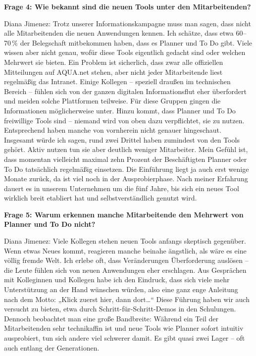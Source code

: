 \documentclass[
    12pt, 
    a4paper,
    ]{scrartcl} %
\begin{document}
\textbf{Frage 4: Wie bekannt sind die neuen Tools unter den Mitarbeitenden?}

Diana Jimenez: Trotz unserer Informationskampagne muss man sagen, dass nicht alle Mitarbeitenden die neuen Anwendungen kennen. Ich schätze, dass etwa 60–70\,\% der Belegschaft mitbekommen haben, dass es Planner und To Do gibt. Viele wissen aber nicht genau, wofür diese Tools eigentlich gedacht sind oder welchen Mehrwert sie bieten. Ein Problem ist sicherlich, dass zwar alle offiziellen Mitteilungen auf AQUA.net stehen, aber nicht jeder Mitarbeitende liest regelmäßig das Intranet. Einige Kollegen – speziell draußen im technischen Bereich – fühlen sich von der ganzen digitalen Informationsflut eher überfordert und meiden solche Plattformen teilweise. Für diese Gruppen gingen die Informationen möglicherweise unter. Hinzu kommt, dass Planner und To Do freiwillige Tools sind – niemand wird von oben dazu verpflichtet, sie zu nutzen. Entsprechend haben manche von vornherein nicht genauer hingeschaut. Insgesamt würde ich sagen, rund zwei Drittel haben zumindest von den Tools gehört. Aktiv nutzen tun sie aber deutlich weniger Mitarbeiter. Mein Gefühl ist, dass momentan vielleicht maximal zehn Prozent der Beschäftigten Planner oder To Do tatsächlich regelmäßig einsetzen. Die Einführung liegt ja auch erst wenige Monate zurück, da ist viel noch in der Ausprobierphase. Nach meiner Erfahrung dauert es in unserem Unternehmen um die fünf Jahre, bis sich ein neues Tool wirklich breit etabliert hat und selbstverständlich genutzt wird.

\textbf{Frage 5: Warum erkennen manche Mitarbeitende den Mehrwert von Planner und To Do nicht?}

Diana Jimenez: Viele Kollegen stehen neuen Tools anfangs skeptisch gegenüber. Wenn etwas Neues kommt, reagieren manche beinahe ängstlich, als wäre es eine völlig fremde Welt. Ich erlebe oft, dass Veränderungen Überforderung auslösen – die Leute fühlen sich von neuen Anwendungen eher erschlagen. Aus Gesprächen mit Kolleginnen und Kollegen habe ich den Eindruck, dass sich viele mehr Unterstützung an der Hand wünschen würden, also eine ganz enge Anleitung nach dem Motto: „Klick zuerst hier, dann dort…“ Diese Führung haben wir auch versucht zu bieten, etwa durch Schritt-für-Schritt-Demos in den Schulungen. Dennoch beobachtet man eine große Bandbreite: Während ein Teil der Mitarbeitenden sehr technikaffin ist und neue Tools wie Planner sofort intuitiv ausprobiert, tun sich andere viel schwerer damit. Es gibt quasi zwei Lager – oft auch entlang der Generationen.
\end{document}
